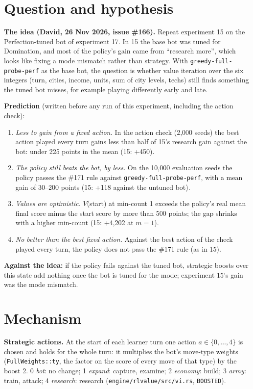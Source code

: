 \documentclass{../polyexp}
\begin{document}

\ExpHeader

\section{Question and hypothesis}
\textbf{The idea (David, 26 Nov 2026, issue \#166).} Repeat experiment 15 on the Perfection-tuned bot of experiment
17. In 15 the base bot was tuned for Domination, and most of the policy's gain came from ``research more'', which
looks like fixing a mode mismatch rather than strategy. With \texttt{greedy-full-probe-perf} as the base bot, the
question is whether value iteration over the six integers (turn, cities, income, units, sum of city levels, techs)
still finds something the tuned bot misses, for example playing differently early and late.

\textbf{Prediction} (written before any run of this experiment, including the action check):
\begin{enumerate}
  \item \emph{Less to gain from a fixed action.} In the action check (2{,}000 seeds) the best action played every
        turn gains less than half of 15's research gain against the bot: under 225 points in the mean
        (15: +450).
  \item \emph{The policy still beats the bot, by less.} On the 10{,}000 evaluation seeds the policy passes the
        \#171 rule against \texttt{greedy-full-probe-perf}, with a mean gain of 30--200 points (15: +118 against the
        untuned bot).
  \item \emph{Values are optimistic.} $V$(start) at min-count 1 exceeds the policy's real mean final score minus
        the start score by more than 500 points; the gap shrinks with a higher min-count (15: +4{,}202 at $m=1$).
  \item \emph{No better than the best fixed action.} Against the best action of the check played every turn, the
        policy does not pass the \#171 rule (as in 15).
\end{enumerate}
\textbf{Against the idea:} if the policy fails against the tuned bot, strategic boosts over this state add nothing
once the bot is tuned for the mode; experiment 15's gain was the mode mismatch.

\section{Mechanism}
\textbf{Strategic actions.} At the start of each learner turn one action $a \in \{0,\dots,4\}$ is chosen and holds
for the whole turn: it multiplies the bot's move-type weights (\texttt{FullWeights::ty}, the factor on the score of
every move of that type) by the boost 2. 0 \emph{bot}: no change; 1 \emph{expand}: capture, examine;
2 \emph{economy}: build; 3 \emph{army}: train, attack; 4 \emph{research}: research
(\texttt{engine/rlvalue/src/vi.rs}, \texttt{BOOSTED}).
\end{document}
